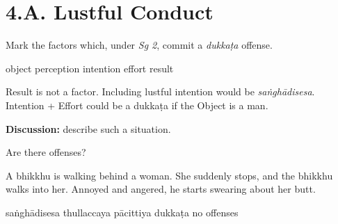 \chapter{4.A. Lustful Conduct}
\renewcommand*{\theChapterTitle}{4.A. Lustful Conduct}

\begin{exam}{\autoExamName}

\begin{problem*}

  \begin{parts}

  \item Mark the factors which, under \textit{Sg 2}, commit a \textit{dukkaṭa} offense.

    \bigskip

    \begin{answers}{6}
      \bChoices
       object\eAns
       perception\eAns
       intention\eAns
       effort\eAns
       result\eAns
      \eChoices
    \end{answers}

    \bigskip

    \begin{solution}
      Result is not a factor.
      Including lustful intention would be \emph{saṅghādisesa}.
      Intention + Effort could be a dukkaṭa if the Object is a man.
    \end{solution}

    \textbf{Discussion:} describe such a situation.

  \end{parts}

\end{problem*}

\problemDivide

\begin{problem*}

  Are there offenses?

  \begin{parts}

  \item
    A bhikkhu is walking behind a woman. She suddenly stops, and the bhikkhu walks
    into her. Annoyed and angered, he starts swearing about her butt.

    \bigskip

    \begin{answers}{5}
      \bChoices
       saṅghādisesa\eAns
       thullaccaya\eAns
       pācittiya\eAns
       dukkaṭa\eAns
       no offenses\eAns
      \eChoices
    \end{answers}


\end{parts}
\end{problem*}
\end{exam}
